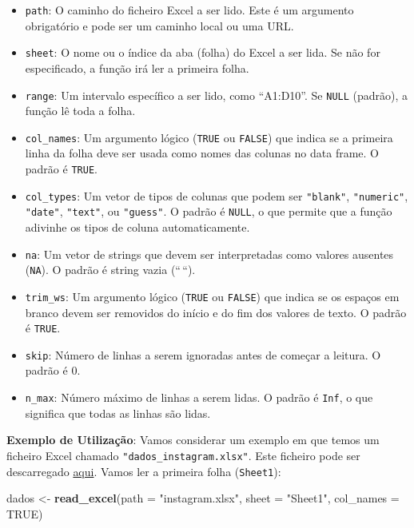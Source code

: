\documentclass[
]{book}
\newenvironment{Shaded}{\begin{snugshade}}{\end{snugshade}}
\newcommand{\AttributeTok}[1]{\textcolor[rgb]{0.13,0.29,0.53}{#1}}
\newcommand{\ConstantTok}[1]{\textcolor[rgb]{0.56,0.35,0.01}{#1}}
\newcommand{\FunctionTok}[1]{\textcolor[rgb]{0.13,0.29,0.53}{\textbf{#1}}}
\newcommand{\NormalTok}[1]{#1}
\newcommand{\OtherTok}[1]{\textcolor[rgb]{0.56,0.35,0.01}{#1}}
\newcommand{\StringTok}[1]{\textcolor[rgb]{0.31,0.60,0.02}{#1}}
\providecommand{\tightlist}{%
  \setlength{\itemsep}{0pt}\setlength{\parskip}{0pt}}
\begin{document}
\begin{itemize}
\tightlist
\item
  \texttt{path}: O caminho do ficheiro Excel a ser lido. Este é um argumento
  obrigatório e pode ser um caminho local ou uma URL.
\item
  \texttt{sheet}: O nome ou o índice da aba (folha) do Excel a ser lida. Se
  não for especificado, a função irá ler a primeira folha.
\item
  \texttt{range}: Um intervalo específico a ser lido, como ``A1:D10''. Se
  \texttt{NULL} (padrão), a função lê toda a folha.
\item
  \texttt{col\_names}: Um argumento lógico (\texttt{TRUE} ou \texttt{FALSE}) que indica se a
  primeira linha da folha deve ser usada como nomes das colunas no
  data frame. O padrão é \texttt{TRUE}.
\item
  \texttt{col\_types}: Um vetor de tipos de colunas que podem ser \texttt{"blank"},
  \texttt{"numeric"}, \texttt{"date"}, \texttt{"text"}, ou \texttt{"guess"}. O padrão é \texttt{NULL}, o
  que permite que a função adivinhe os tipos de coluna
  automaticamente.
\item
  \texttt{na}: Um vetor de strings que devem ser interpretadas como valores
  ausentes (\texttt{NA}). O padrão é string vazia (``\,``).
\item
  \texttt{trim\_ws}: Um argumento lógico (\texttt{TRUE} ou \texttt{FALSE}) que indica se os
  espaços em branco devem ser removidos do início e do fim dos valores
  de texto. O padrão é \texttt{TRUE}.
\item
  \texttt{skip}: Número de linhas a serem ignoradas antes de começar a
  leitura. O padrão é 0.
\item
  \texttt{n\_max}: Número máximo de linhas a serem lidas. O padrão é \texttt{Inf}, o
  que significa que todas as linhas são lidas.
\end{itemize}

\textbf{Exemplo de Utilização}: Vamos considerar um exemplo em que temos um ficheiro Excel chamado \texttt{"dados\_instagram.xlsx"}. Este ficheiro pode ser descarregado \href{https://renatorpaula.wixsite.com/renato/laboratorio-estatistica}{aqui}. Vamos ler a primeira folha (\texttt{Sheet1}):

\begin{Shaded}
\begin{Highlighting}[]
\NormalTok{dados }\OtherTok{\textless{}{-}} \FunctionTok{read\_excel}\NormalTok{(}\AttributeTok{path =} \StringTok{"instagram.xlsx"}\NormalTok{,}
                    \AttributeTok{sheet =} \StringTok{"Sheet1"}\NormalTok{,}
                    \AttributeTok{col\_names =} \ConstantTok{TRUE}\NormalTok{)}
\end{Highlighting}
\end{Shaded}
\end{document}
